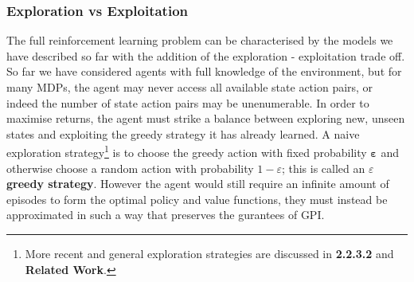\subsubsection{Exploration vs Exploitation}
The full reinforcement learning problem can be characterised by the models we have described so far
with the addition of the exploration - exploitation trade off. So far we have considered agents with full knowledge of the environment, but
for many MDPs, the agent may never access all available state action pairs, or indeed the number of state action
pairs may be unenumerable. In order to maximise returns, the agent must strike a balance between exploring new, unseen states and exploiting
the greedy strategy it has already learned. A naive exploration strategy\footnote{More recent and general exploration strategies are discussed
in \textbf{2.2.3.2} and \textbf{Related Work}.} is to choose the greedy action with fixed probability
$\mathbf{\varepsilon}$ and otherwise choose a random action with probability $1-\varepsilon$; this is called an
\textbf{$\varepsilon$ greedy strategy}. However the agent would still require an infinite
amount of episodes to form the optimal policy and value functions, they must instead be approximated
in such a way that preserves the gurantees of GPI.
